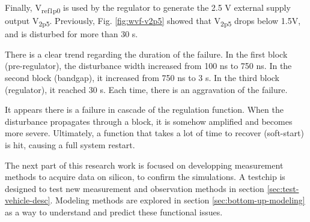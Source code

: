 Finally, V\textsubscript{ref1p0} is used by the regulator to generate the 2.5 V external supply output V\textsubscript{2p5}.
Previously,  Fig. \ref{fig:wvf-v2p5} showed that V\textsubscript{2p5} drops below 1.5V, and is disturbed for more than 30 \textmugreek{}s.

There is a clear trend regarding the duration of the failure.
In the first block (pre-regulator), the disturbance width increased from 100 ns to 750 ns.
In the second block (bandgap), it increased from 750 ns to 3 \textmugreek{}s.
In the third block (regulator), it reached 30 \textmugreek{}s.
Each time, there is an aggravation of the failure.

It appears there is a failure in cascade of the regulation function.
When the disturbance propagates through a block, it is somehow amplified and becomes more severe.
Ultimately, a function that takes a lot of time to recover (soft-start) is hit, causing a full system restart.

The next part of this research work is focused on developping measurement methods to acquire data on silicon, to confirm the simulations.
A testchip is designed to test new measurement and observation methods in section \ref{sec:test-vehicle-desc}.
Modeling methods are explored in section \ref{sec:bottom-up-modeling} as a way to understand and predict these functional issues.
